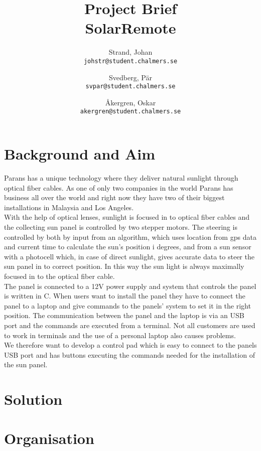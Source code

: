 \documentclass[a4paper]{article}
\author{	Strand, Johan \\ \texttt{johstr@student.chalmers.se} \and
			Svedberg, Pär\\ \texttt{svpar@student.chalmers.se} \and
			Åkergren, Oskar\\ \texttt{akergren@student.chalmers.se}
}
\title{\vspace{-3cm} Project Brief  \\ SolarRemote}
\begin{document}
	\maketitle
	\section*{Background and Aim} %
	\label{sec:background_and_aim}
	Parans has a unique technology where they deliver natural sunlight through optical fiber cables. As one of only two companies in the world Parans has business all over the world and right now they have two of their biggest installations in Malaysia and Los Angeles. \\

	\noindent With the help of optical lenses, sunlight is focused in to optical fiber cables and the collecting sun panel is controlled by two stepper motors. The steering is controlled by both by input from an algorithm, which uses location from gps data and current time to calculate the sun's position i degrees, and from a sun sensor with a photocell which, in case of direct sunlight, gives accurate data to steer the sun panel in to correct position. In this way the sun light is always maximally focused in to the optical fiber cable. \\

    \noindent The panel is connected to a 12V power supply and system that controls the panel is written in C. When users want to install the panel they have to connect the panel to a laptop and give commands to the panels' system to set it in the right position.
    The communication between the panel and the laptop is via an USB port and the commands are executed from a terminal. Not all customers are used to work in terminals and the use of a personal laptop also causes problems. \\

    \noindent We therefore want to develop a control pad which is easy to connect to the panels USB port and has buttons executing the commands needed for the installation of the sun panel.

	
	\section*{Solution} %
	\label{sec:solution}
	
	\section*{Organisation} %
	\label{sec:organisation}
	
\end{document}
